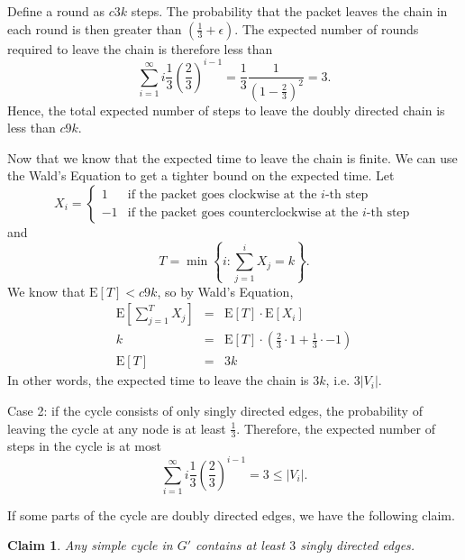 \documentclass [letterpaper] {article}
\newtheorem{claim}{Claim}
\begin{document}
Define a round as $c3k$ steps. The probability that the packet leaves the chain in each round is then greater than $(\frac{1}{3} + \epsilon)$. The expected number of rounds required to leave the chain is therefore less than 
\[  \sum_{i=1}^{\infty}i\frac{1}{3}\left(\frac{2}{3}\right)^{i-1} =  \frac{1}{3}\frac{1}{(1-\frac{2}{3})^{2}} = 3.\]
Hence, the total expected number of steps to leave the doubly directed chain is less than $c9k$.

Now that we know that the expected time to leave the chain is finite. We can use the Wald's Equation to get a tighter bound on the expected time. Let
\[
X_{i} = \left\{
    \begin{array}{rl}
      1 & \textrm{if the packet goes clockwise at the $i$-th step}\\
      -1 & \textrm{if the packet goes counterclockwise at the $i$-th step}
    \end{array} \right.
\]
and 
\[ T = \min\left\{i : \sum_{j=1}^{i}X_{j} = k \right\}.\]
We know that $\mathrm{E}[T] < c9k$, so by Wald's Equation,
\begin{eqnarray}
  \mathrm{E}\left[\sum_{j=1}^{T}X_{j}\right] &=& \mathrm{E}[T] \cdot \mathrm{E}[X_{i}] \nonumber \\
  k  &=& \mathrm{E}[T] \cdot \left( \frac{2}{3} \cdot 1 + \frac{1}{3} \cdot -1 \right) \nonumber \\
  \mathrm{E}[T]&=& 3k \nonumber
\end{eqnarray}
In other words, the expected time to leave the chain is $3k$, i.e. $3|V_{i}|$.

Case 2: if the cycle consists of only singly directed edges, the probability of leaving the cycle at any node is at least $\frac{1}{3}$. Therefore, the expected number of steps in the cycle is at most
  \[ \sum_{i=1}^{\infty}i\frac{1}{3}\left(\frac{2}{3}\right)^{i-1} = 3 \leq |V_{i}|. \]

If some parts of the cycle are doubly directed edges, we have the following claim.

\begin{claim}
\label{claim:threeincycle}
   Any simple cycle in $G'$ contains at least $3$ singly directed edges.
\end{claim}
\end{document}

